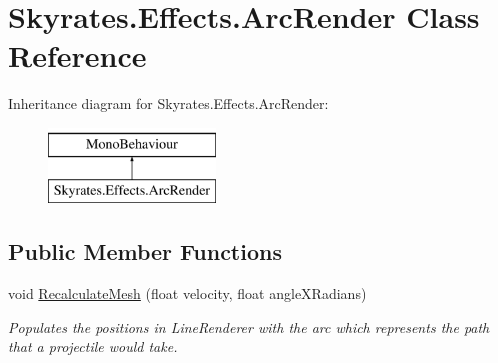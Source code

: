 \hypertarget{class_skyrates_1_1_effects_1_1_arc_render}{\section{Skyrates.\-Effects.\-Arc\-Render Class Reference}
\label{class_skyrates_1_1_effects_1_1_arc_render}
}
Inheritance diagram for Skyrates.\-Effects.\-Arc\-Render\-:\begin{figure}[H]
\begin{center}
\leavevmode
\includegraphics[height=2.000000cm]{class_skyrates_1_1_effects_1_1_arc_render}
\end{center}
\end{figure}
\subsection*{Public Member Functions}
\begin{DoxyCompactItemize}
\item 
void \hyperlink{class_skyrates_1_1_effects_1_1_arc_render_ad52088d23c35b7822aa7de4778208be8}{Recalculate\-Mesh} (float velocity, float angle\-X\-Radians)
\begin{DoxyCompactList}\small\item\em Populates the positions in Line\-Renderer with the arc which represents the path that a projectile would take. \end{DoxyCompactList}\end{DoxyCompactItemize}
